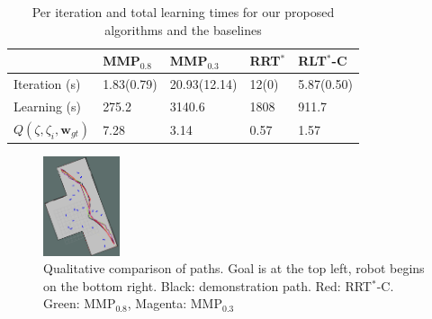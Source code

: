 \documentclass{article}  %
\begin{document}
	\begin{table}[]
	\centering

	\begin{tabular}{|l|l|l|l|l|}
	\hline
	               & MMP$_{0.8}$     & MMP$_{0.3}$       & RRT$^*$  & RLT$^*$-C \\ \hline
	Iteration (s) & 1.83(0.79) & 20.93(12.14) & 12(0) & 5.87(0.50)  \\ \hline
	Learning (s) & 275.2      & 3140.6       & 1808  & 911.7       \\ \hline
	$Q(\zeta,\zeta_i,\mathbf{w}_{gt})$ & 7.28      & 3.14       & 0.57  & 1.57       \\ \hline
	\end{tabular}
	\caption{Per iteration and total learning times for our proposed algorithms and the baselines}
	\label{tab:time}
	\end{table}


	\begin{figure}
	\centering
	    \includegraphics[width=0.20\textwidth]{images/path_compare.png}
	  \caption{Qualitative comparison of paths. Goal is at the top left, robot begins on the bottom right. Black: demonstration path. Red: RRT$^*$-C. Green: MMP$_{0.8}$, Magenta: MMP$_{0.3}$ }
	  \label{fig:path_compare}
	\end{figure}
\end{document}
